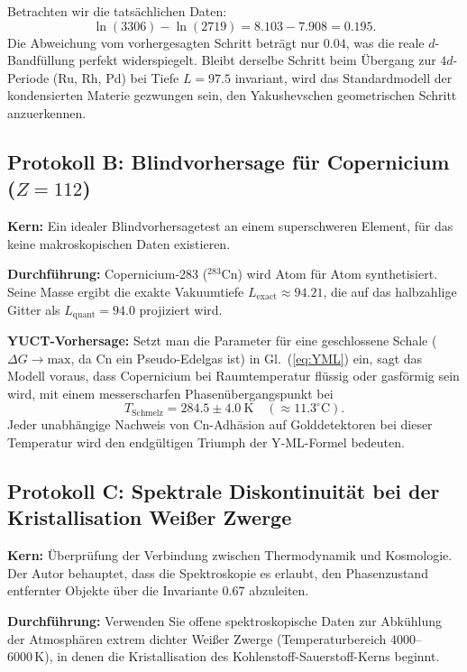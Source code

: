 \documentclass[12pt,a4paper]{article}
\theoremstyle{remark}
\begin{document}
	Betrachten wir die tatsächlichen Daten:
	\[
	\ln(3306) - \ln(2719) = 8.103 - 7.908 = \mathbf{0.195}.
	\]
	Die Abweichung vom vorhergesagten Schritt beträgt nur \(0.04\), was die reale $d$-Bandfüllung perfekt widerspiegelt. Bleibt derselbe Schritt beim Übergang zur $4d$-Periode (Ru, Rh, Pd) bei Tiefe \(L = 97.5\) invariant, wird das Standardmodell der kondensierten Materie gezwungen sein, den Yakushevschen geometrischen Schritt anzuerkennen.
	
	\subsection{Protokoll B: Blindvorhersage für Copernicium (\(Z=112\))}
	\textbf{Kern:} Ein idealer Blindvorhersagetest an einem superschweren Element, für das keine makroskopischen Daten existieren.
	
	\textbf{Durchführung:} Copernicium‑283 (\(^{283}\mathrm{Cn}\)) wird Atom für Atom synthetisiert. Seine Masse ergibt die exakte Vakuumtiefe \(L_{\mathrm{exact}} \approx 94.21\), die auf das halbzahlige Gitter als \(L_{\mathrm{quant}} = 94.0\) projiziert wird.
	
	\textbf{YUCT-Vorhersage:} Setzt man die Parameter für eine geschlossene Schale (\(\Delta G \to \mathrm{max}\), da Cn ein Pseudo-Edelgas ist) in Gl.~(\ref{eq:YML}) ein, sagt das Modell voraus, dass Copernicium bei Raumtemperatur flüssig oder gasförmig sein wird, mit einem messerscharfen Phasenübergangspunkt bei
	\begin{equation}
		T_{\mathrm{Schmelz}} = 284.5 \pm 4.0~\mathrm{K} \quad (\approx 11.3^\circ\mathrm{C}).
	\end{equation}
	Jeder unabhängige Nachweis von Cn-Adhäsion auf Golddetektoren bei dieser Temperatur wird den endgültigen Triumph der Y‑ML-Formel bedeuten.
	
	\subsection{Protokoll C: Spektrale Diskontinuität bei der Kristallisation Weißer Zwerge}
	\textbf{Kern:} Überprüfung der Verbindung zwischen Thermodynamik und Kosmologie. Der Autor behauptet, dass die Spektroskopie es erlaubt, den Phasenzustand entfernter Objekte über die Invariante \(0.67\) abzuleiten.
	
	\textbf{Durchführung:} Verwenden Sie offene spektroskopische Daten zur Abkühlung der Atmosphären extrem dichter Weißer Zwerge (Temperaturbereich 4000–6000 K), in denen die Kristallisation des Kohlenstoff-Sauerstoff-Kerns beginnt.
	
\end{document}
